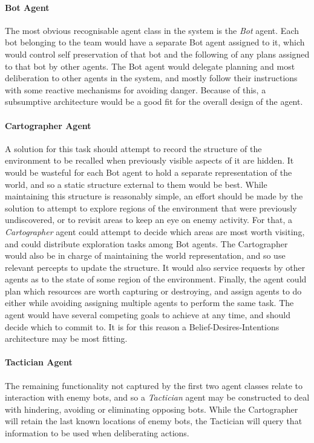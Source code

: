 \documentclass[a4paper,10pt]{article}
\begin{document}
\paragraph{Bot Agent}
The most obvious recognisable agent class in the system is the \emph{Bot} agent. Each bot belonging to the team would have a separate Bot agent assigned to it, which would control self preservation of that bot and the following of any plans assigned to that bot by other agents. The Bot agent would delegate planning and most deliberation to other agents in the system, and mostly follow their instructions with some reactive mechanisms for avoiding danger. Because of this, a subsumptive architecture\cite{brooks90} would be a good fit for the overall design of the agent.

\paragraph{Cartographer Agent}
A solution for this task should attempt to record the structure of the environment to be recalled when previously visible aspects of it are hidden. It would be wasteful for each Bot agent to hold a separate representation of the world, and so a static structure external to them would be best. While maintaining this structure is reasonably simple, an effort should be made by the solution to attempt to explore regions of the environment that were previously undiscovered, or to revisit areas to keep an eye on enemy activity. For that, a \emph{Cartographer} agent could attempt to decide which areas are most worth visiting, and could distribute exploration tasks among Bot agents. The Cartographer would also be in charge of maintaining the world representation, and so use relevant percepts to update the structure. It would also service requests by other agents as to the state of some region of the environment. Finally, the agent could plan which resources are worth capturing or destroying, and assign agents to do either while avoiding assigning multiple agents to perform the same task. The agent would have several competing goals to achieve at any time, and should decide which to commit to. It is for this reason a Belief-Desires-Intentions architecture may be most fitting.

\paragraph{Tactician Agent}
The remaining functionality not captured by the first two agent classes relate to interaction with enemy bots, and so a \emph{Tactician} agent may be constructed to deal with hindering, avoiding or eliminating opposing bots. While the Cartographer will retain the last known locations of enemy bots, the Tactician will query that information to be used when deliberating actions.
\end{document}
